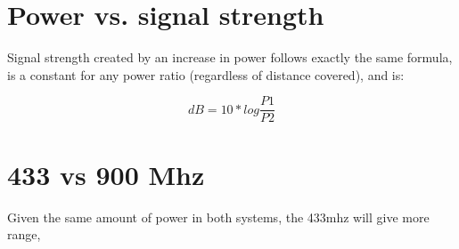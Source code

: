 \documentclass[paper=letter, fontsize=10pt]{article}
\begin{document}
\section{Power vs. signal strength}

Signal strength created by an increase in power follows exactly the same formula, is a constant for any power ratio (regardless of distance covered), and is:

$$dB = 10*log \frac{P1}{P2}$$

\section{433 vs 900 Mhz}
Given the same amount of power in both systems, the 433mhz will give more range, 




\end{document}
